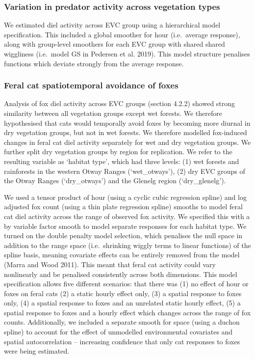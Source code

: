 \documentclass[]{elsarticle} %
\begin{document}
\hypertarget{variation-in-predator-activity-across-vegetation-types}{%
\subsubsection{Variation in predator activity across vegetation types}\label{variation-in-predator-activity-across-vegetation-types}}

We estimated diel activity across EVC group using a hierarchical model specification. This included a global smoother for hour (i.e.~average response), along with group-level smoothers for each EVC group with shared shared wiggliness (i.e.~model GS in Pedersen et al. 2019). This model structure penalises functions which deviate strongly from the average response.

\hypertarget{feral-cat-spatiotemporal-avoidance-of-foxes}{%
\subsubsection{Feral cat spatiotemporal avoidance of foxes}\label{feral-cat-spatiotemporal-avoidance-of-foxes}}

Analysis of fox diel activity across EVC groups (section 4.2.2) showed strong similarity between all vegetation groups except wet forests. We therefore hypothesised that cats would temporally avoid foxes by becoming more diurnal in dry vegetation groups, but not in wet forests. We therefore modelled fox-induced changes in feral cat diel activity separately for wet and dry vegetation groups. We further split dry vegetation groups by region for replication. We refer to the resulting variable as `habitat type', which had three levels: (1) wet forests and rainforests in the western Otway Ranges (`wet\_otways'), (2) dry EVC groups of the Otway Ranges (`dry\_otways') and the Glenelg region (`dry\_glenelg').

We used a tensor product of hour (using a cyclic cubic regression spline) and log adjusted fox count (using a thin plate regression spline) smooths to model feral cat diel activity across the range of observed fox activity. We specified this with a by variable factor smooth to model separate responses for each habitat type. We turned on the double penalty model selection, which penalises the null space in addition to the range space (i.e.~shrinking wiggly terms to linear functions) of the spline basis, meaning covariate effects can be entirely removed from the model (Marra and Wood 2011). This meant that feral cat activity could vary nonlinearly and be penalised consistently across both dimensions. This model specification allows five different scenarios: that there was (1) no effect of hour or foxes on feral cats (2) a static hourly effect only, (3) a spatial response to foxes only, (4) a spatial response to foxes and an unrelated static hourly effect, (5) a spatial response to foxes and a hourly effect which changes across the range of fox counts. Additionally, we included a separate smooth for space (using a duchon spline) to account for the effect of unmodelled environmental covariates and spatial autocorrelation -- increasing confidence that only cat responses to foxes were being estimated.
\end{document}

